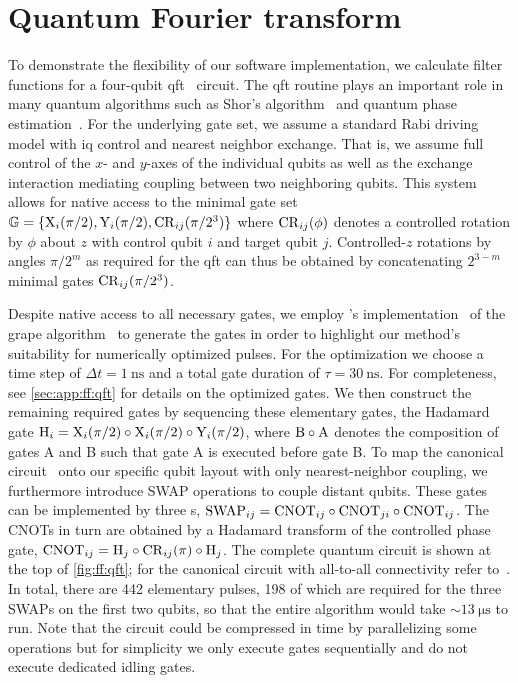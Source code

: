 \section{Quantum Fourier transform}\label{sec:ff:examples:qft}
To demonstrate the flexibility of our software implementation, we calculate filter functions for a four-qubit \acrfull{qft}~\cite{Coppersmith1994,Nielsen2011} circuit.
The \gls{qft} routine plays an important role in many quantum algorithms such as Shor's algorithm~\cite{Shor1997} and quantum phase estimation~\cite{Nielsen2011}.
For the underlying gate set, we assume a standard Rabi driving model with \gls{iq} control and nearest neighbor exchange.
That is, we assume full control of the $x$- and $y$-axes of the individual qubits as well as the exchange interaction mediating coupling between two neighboring qubits.
This system allows for native access to the minimal gate set $\mathbb{G} = \lbrace\mathrm{X}_{i}(\pi/2),\mathrm{Y}_{i}(\pi/2),\mathrm{CR}_{ij}(\pi/2^3)\rbrace$ where $\mathrm{CR}_{ij}(\phi)$ denotes a controlled rotation by $\phi$ about $z$ with control qubit $i$ and target qubit $j$.
Controlled-$z$ rotations by angles $\pi/2^m$ as required for the \gls{qft} can thus be obtained by concatenating $2^{3-m}$ minimal gates $\mathrm{CR}_{ij}(\pi/2^3)$.

Despite native access to all necessary gates, we employ \qutip's implementation~\cite{Johansson2012} of the \gls{grape} algorithm~\cite{Khaneja2005,Schulte-Herbruggen2005} to generate the gates in order to highlight our method's suitability for numerically optimized pulses.
For the optimization we choose a time step of $\Delta t = \qty{1}{\nano\second}$ and a total gate duration of $\tau = \qty{30}{\nano\second}$.
For completeness, see \cref{sec:app:ff:qft} for details on the optimized gates.
We then construct the remaining required gates by sequencing these elementary gates, \ie the Hadamard gate $\mathrm{H}_i = \mathrm{X}_{i}(\pi/2)\circ\mathrm{X}_{i}(\pi/2)\circ\mathrm{Y}_{i}(\pi/2)$, where $\mathrm{B}\circ\mathrm{A}$ denotes the composition of gates A and B such that gate A is executed before gate B\@.
To map the canonical circuit~\cite{Nielsen2011} onto our specific qubit layout with only nearest-neighbor coupling, we furthermore introduce SWAP operations to couple distant qubits.
These gates can be implemented by three s, $\mathrm{SWAP}_{ij} = \mathrm{CNOT}_{ij}\circ\mathrm{CNOT}_{ji}\circ\mathrm{CNOT}_{ij}$.
The CNOTs in turn are obtained by a Hadamard transform of the controlled phase gate, $\mathrm{CNOT}_{ij} = \mathrm{H}_j\circ\mathrm{CR}_{ij}(\pi)\circ\mathrm{H}_j$.
The complete quantum circuit is shown at the top of \cref{fig:ff:qft}; for the canonical circuit with all-to-all connectivity refer to~.
In total, there are \num{442} elementary pulses, \num{198} of which are required for the three SWAPs on the first two qubits, so that the entire algorithm would take $\sim\qty{13}{\micro\second}$ to run.
Note that the circuit could be compressed in time by parallelizing some operations but for simplicity we only execute gates sequentially and do not execute dedicated idling gates.


